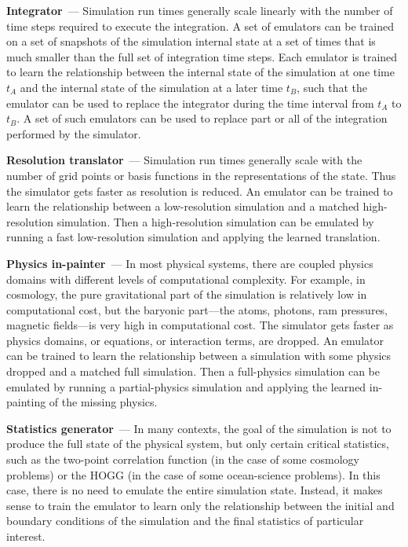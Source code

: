 \documentclass[11pt]{article}
\renewcommand{\paragraph}[1]{\smallskip\par\noindent\textbf{#1}~---}
\begin{document}
\paragraph{Integrator}
Simulation run times generally scale linearly with the number of time steps required to execute the integration.
A set of emulators can be trained on a set of snapshots of the simulation internal state at a set of times that is much smaller than the full set of integration time steps.
Each emulator is trained to learn the relationship between the internal state of the simulation at one time $t_A$ and the internal state of the simulation at a later time $t_B$, such that the emulator can be used to replace the integrator during the time interval from $t_A$ to $t_B$.
A set of such emulators can be used to replace part or all of the integration performed by the simulator.

\paragraph{Resolution translator}
Simulation run times generally scale with the number of grid points or basis functions in the representations of the state.
Thus the simulator gets faster as resolution is reduced.
An emulator can be trained to learn the relationship between a low-resolution simulation and a matched high-resolution simulation.
Then a high-resolution simulation can be emulated by running a fast low-resolution simulation and applying the learned translation.

\paragraph{Physics in-painter}
In most physical systems, there are coupled physics domains with different levels of computational complexity.
For example, in cosmology, the pure gravitational part of the simulation is relatively low in computational cost, but the baryonic part---the atoms, photons, ram pressures, magnetic fields---is very high in computational cost.
The simulator gets faster as physics domains, or equations, or interaction terms, are dropped.
An emulator can be trained to learn the relationship between a simulation with some physics dropped and a matched full simulation.
Then a full-physics simulation can be emulated by running a partial-physics simulation and applying the learned in-painting of the missing physics.

\paragraph{Statistics generator}
In many contexts, the goal of the simulation is not to produce the full state of the physical system, but only certain critical statistics, such as the two-point correlation function (in the case of some cosmology problems) or the HOGG (in the case of some ocean-science problems).
In this case, there is no need to emulate the entire simulation state.
Instead, it makes sense to train the emulator to learn only the relationship between the initial and boundary conditions of the simulation and the final statistics of particular interest.
\end{document}
